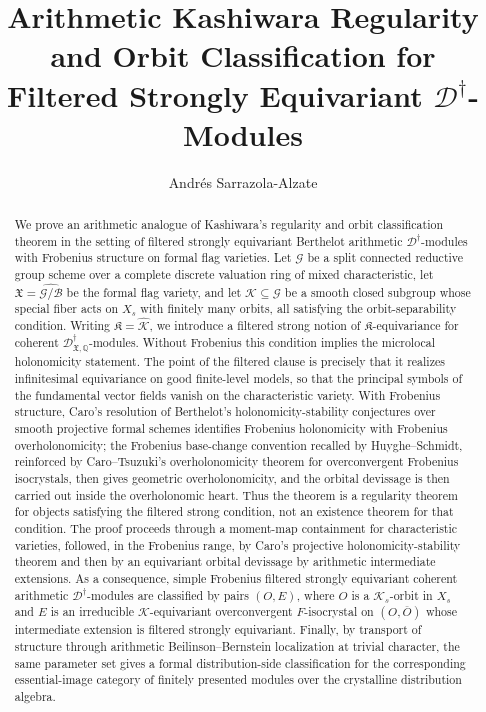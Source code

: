 \documentclass[11pt]{amsart}
\title[Filtered Strongly Equivariant Arithmetic $D^\dagger$-Modules]
{Arithmetic Kashiwara Regularity and Orbit Classification for Filtered Strongly Equivariant  \(\mathscr D^\dagger\)-Modules}
\author{Andr\'es Sarrazola-Alzate}
\date{}
\theoremstyle{plain}
\theoremstyle{definition}
\theoremstyle{remark}
\begin{document}
\begin{abstract}
We prove an arithmetic analogue of Kashiwara's regularity and orbit
classification theorem in the setting of filtered strongly equivariant Berthelot
arithmetic \(\mathscr D^\dagger\)-modules with Frobenius structure on formal
flag varieties. Let \(\mathcal G\) be a split connected reductive group scheme
over a complete discrete valuation ring of mixed characteristic, let
\(\mathfrak X=\widehat{\mathcal G/\mathcal B}\) be the formal flag variety,
and let \(\mathcal K\subseteq\mathcal G\) be a smooth closed subgroup whose
special fiber acts on \(X_s\) with finitely many orbits, all satisfying the orbit-separability condition. Writing
\(\mathfrak K=\widehat{\mathcal K}\), we introduce a filtered strong notion of
\(\mathfrak K\)-equivariance for coherent
\(\mathscr D^\dagger_{\mathfrak X,\mathbb Q}\)-modules.  Without Frobenius this
condition implies the microlocal holonomicity statement.  The point of the
filtered clause is precisely that it realizes infinitesimal equivariance on good finite-level models, so that the principal symbols of the fundamental vector fields vanish on the characteristic variety.  With Frobenius
structure, Caro's resolution of Berthelot's holonomicity-stability conjectures over smooth projective formal schemes identifies Frobenius holonomicity with Frobenius overholonomicity; the Frobenius base-change convention recalled by Huyghe--Schmidt, reinforced by Caro--Tsuzuki's overholonomicity theorem for overconvergent Frobenius isocrystals, then gives geometric overholonomicity, and the orbital devissage is then carried
out inside the overholonomic heart.  Thus the theorem is a regularity theorem for objects satisfying the filtered strong condition, not an existence theorem for that condition. The proof
proceeds through a moment-map containment for characteristic varieties,
followed, in the Frobenius range, by Caro's projective holonomicity-stability theorem
and then by an equivariant orbital devissage by arithmetic intermediate extensions. As a consequence, simple Frobenius filtered
strongly equivariant coherent arithmetic \(\mathscr D^\dagger\)-modules are
classified by pairs \((O,E)\), where \(O\) is a \(\mathcal K_s\)-orbit in
\(X_s\) and \(E\) is an irreducible \(\mathcal K\)-equivariant overconvergent
\(F\)-isocrystal on \((O,\overline O)\) whose intermediate extension is filtered
strongly equivariant.  Finally, by transport of structure through arithmetic
Beilinson--Bernstein localization at trivial character, the same parameter set
gives a formal distribution-side classification for the corresponding
essential-image category of finitely presented modules over the crystalline
distribution algebra.
\end{abstract}
\end{document}
